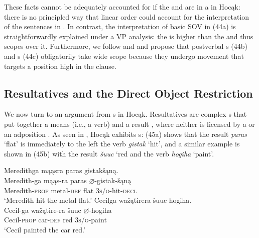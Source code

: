 \documentclass[output=paper]{LSP/langsci}
\begin{document}
 
These facts cannot be adequately accounted for if the  and  are in a  in Hocąk: there is no principled way that linear order could account for the interpretation of the sentences in . In contrast, the interpretation of basic SOV  in (44a) is straightforwardly explained under a VP analysis: the  is higher than the  and thus scopes over it. Furthermore, we follow \citet{Johnson2014} and  \citet{JohnsonRosen2014} and propose that postverbal s (44b) and s (44c) obligatorily take wide scope because they undergo movement that targets a position high in the clause. 

\subsection{Resultatives and the Direct Object Restriction}

We now turn to an argument from s in Hocąk. Resultatives are complex s that put together a means  (i.e., a verb) and a result , where neither is licensed by a  or an adposition \citep[507]{Williams2008}. As seen in , Hocąk exhibits s: (45a) shows that the result \textit{paras} `flat' is immediately to the left the verb \textit{gistak} `hit', and a similar example is shown in (45b) with the result \textit{\v{s}uuc} `red and the verb \textit{hogiha} `paint'.
 

\begin{exe}
\ex\label{ex:jrs:45}
\begin{xlist}
\ex 
\glll Meredithga	mąąsra		paras	gistak\v{s}ąną.\\
Meredith-ga			mąąs-ra	paras	$\varnothing$-gistak-\v{s}ąną \\
	Meredith-\textsc{prop}		metal-\textsc{def}		flat	 \textsc{3s/o}-hit-\textsc{decl} \\
\trans `Meredith hit the metal flat.'
\ex 
\glll Cecilga	wa\v{z}ątirera	 \v{s}uuc	hogiha.\\
Cecil-ga	wa\v{z}ątire-ra \v{s}uuc	$\varnothing$-hogiha \\
	Cecil-\textsc{prop}	car-\textsc{def}	red		\textsc{3s/o}-paint \\
\trans `Cecil painted the car red.'
\end{xlist}
\end{exe}
\end{document}
